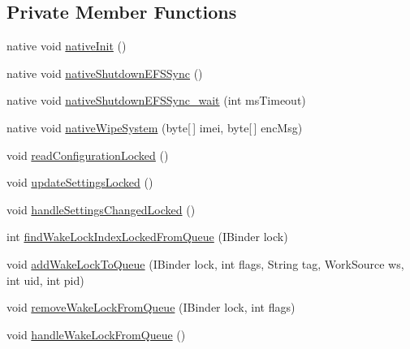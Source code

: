 \subsection*{Private Member Functions}
\begin{DoxyCompactItemize}
\item 
native void \hyperlink{classcom_1_1android_1_1server_1_1power_1_1PowerManagerService_a6ead732c63f10b506478db164c4e08b3}{native\-Init} ()
\item 
native void \hyperlink{classcom_1_1android_1_1server_1_1power_1_1PowerManagerService_af00c42a312e5c98e6588ac1041cdf12d}{native\-Shutdown\-E\-F\-S\-Sync} ()
\item 
native void \hyperlink{classcom_1_1android_1_1server_1_1power_1_1PowerManagerService_a76cb1103b9171a73ce01646593771220}{native\-Shutdown\-E\-F\-S\-Sync\-\_\-wait} (int ms\-Timeout)
\item 
native void \hyperlink{classcom_1_1android_1_1server_1_1power_1_1PowerManagerService_a22b29be6f94082b12fe965ddeb3e90fa}{native\-Wipe\-System} (byte\mbox{[}$\,$\mbox{]} imei, byte\mbox{[}$\,$\mbox{]} enc\-Msg)
\item 
void \hyperlink{classcom_1_1android_1_1server_1_1power_1_1PowerManagerService_aba613d028f8d3d36cb70b70a13dce73d}{read\-Configuration\-Locked} ()
\item 
void \hyperlink{classcom_1_1android_1_1server_1_1power_1_1PowerManagerService_a46474c2cd7f9b0fecf03d72e449beb34}{update\-Settings\-Locked} ()
\item 
void \hyperlink{classcom_1_1android_1_1server_1_1power_1_1PowerManagerService_a9a44c6cbda6012967441349c7b0b0f04}{handle\-Settings\-Changed\-Locked} ()
\item 
int \hyperlink{classcom_1_1android_1_1server_1_1power_1_1PowerManagerService_a23fc9431b15e93a676ed2c9428e44426}{find\-Wake\-Lock\-Index\-Locked\-From\-Queue} (I\-Binder lock)
\item 
void \hyperlink{classcom_1_1android_1_1server_1_1power_1_1PowerManagerService_a07c4777bfd8a6f3cb3adb843277165d5}{add\-Wake\-Lock\-To\-Queue} (I\-Binder lock, int flags, String tag, Work\-Source ws, int uid, int pid)
\item 
void \hyperlink{classcom_1_1android_1_1server_1_1power_1_1PowerManagerService_a23a182508b3dbd6325248e829a35b112}{remove\-Wake\-Lock\-From\-Queue} (I\-Binder lock, int flags)
\item 
void \hyperlink{classcom_1_1android_1_1server_1_1power_1_1PowerManagerService_a1537fa2981353bfa7d1f91198dda3d1f}{handle\-Wake\-Lock\-From\-Queue} ()

\end{DoxyCompactItemize}
